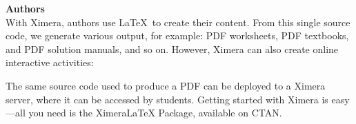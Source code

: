 \documentclass{article}
\begin{document}
\begin{multicols}{2}
    \begin{xframe}
        {\sffamily\bfseries Authors}\\
        With Ximera, authors use \LaTeX\ to create their content. From this
        single
        source code, we generate various output, for example: PDF worksheets,
        PDF
        textbooks, and	PDF solution manuals, and so on. However, Ximera can
        also create
        online interactive activities:
        \begin{center}
        \end{center}
        The same source code used to produce a PDF can be deployed to a Ximera
        server, where it can be accessed by students. Getting started with
        Ximera
        is
        easy---all you need is the XimeraLaTeX Package, available on CTAN.
    \end{xframe}


\end{multicols}
\end{document}
